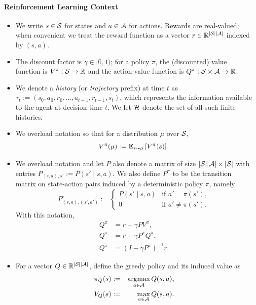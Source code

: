 \paragraph{Reinforcement Learning Context}
\begin{itemize}
\item We write $s\in\mathcal{S}$ for states and $a\in\mathcal{A}$ for actions. Rewards are real-valued; when
  convenient we treat the reward function as a vector $r\in\mathbb{R}^{|\mathcal{S}||\mathcal{A}|}$ indexed by $(s,a)$.

\item The discount factor is $\gamma\in[0,1)$; for a policy $\pi$, the (discounted) value function is
  $V^\pi:\mathcal{S}\to\mathbb{R}$ and the action-value function is $Q^\pi:\mathcal{S}\times\mathcal{A}\to\mathbb{R}$.

\item We denote a \emph{history} (or \emph{trajectory} prefix) at time $t$ as $\tau_t := (s_0, a_0, r_0, \ldots, a_{t-1}, r_{t-1}, s_t)$, which represents the information available to the agent at decision time $t$. We let $\mathcal{H}$ denote the set of all such finite histories.
  
\item We overload notation so that for a distribution $\mu$ over $\mathcal{S}$,
\[
V^\pi(\mu) := \mathbb{E}_{s\sim \mu} \left[V^\pi(s)\right].
\]

\item We overload notation and let $P$ also denote a matrix of size $|\mathcal{S}||\mathcal{A}|\times |\mathcal{S}|$
  with entries $P_{(s,a),s'} := P(s' \mid s,a)$. We also define $P^\pi$ to be the transition matrix on
  state-action pairs induced by a deterministic policy $\pi$, namely
  \[
  P^\pi_{(s,a),(s',a')} :=
  \begin{cases}
    P(s' \mid s,a) & \text{if } a'=\pi(s'),\\
    0 & \text{if } a'\neq \pi(s').
  \end{cases}
  \]
  With this notation,
\begin{align*}
  Q^\pi & = r + \gamma P V^\pi, \\
  Q^\pi & = r + \gamma P^\pi Q^\pi, \\
  Q^\pi & = (I-\gamma P^\pi)^{-1} r.
\end{align*}

\item For a vector $Q \in \mathbb{R}^{|\mathcal{S}||\mathcal{A}|}$, define the greedy policy and its induced value as
\begin{eqnarray*}
  \pi_Q(s) &:=& \operatorname*{argmax}_{a \in \mathcal{A}} Q(s, a), \\
  V_Q(s) &:=& \max_{a\in\mathcal{A}} Q(s,a).
\end{eqnarray*}


\end{itemize}
